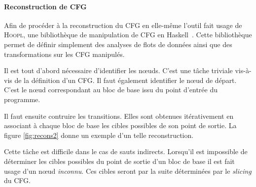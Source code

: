       \paragraph{Reconstruction de CFG}
      { %

        Afin de procéder à la reconstruction du CFG en elle-même l'outil fait
        usage de \textsc{Hoopl}, une bibliothèque de manipulation de CFG en
        Haskell~\cite{RDP10}. Cette bibliothèque permet de définir simplement
        des analyses de flots de données ainsi que des transformations sur les
        CFG manipulés.

        \medskip
        
        Il est tout d'abord nécessaire d'identifier les n{\oe}uds. C'est une
        tâche triviale vis-à-vis de la définition d'un CFG. Il faut également
        identifier le n{\oe}ud de départ. C'est le n{\oe}ud correspondant au
        bloc de base issu du point d'entrée du programme.

        Il faut ensuite contruire les transitions. Elles sont obtenues
        itérativement en associant à chaque bloc de base les cibles possibles de
        son point de sortie. La figure \ref{fig:recons2} donne un exemple d'un
        telle reconstruction.

        Cette tâche est difficile dans le cas de sauts indirects. Lorsqu'il est
        impossible de déterminer les cibles possibles du point de sortie d'un
        bloc de base il est fait usage d'un n{\oe}ud \textit{inconnu}. Ces
        cibles seront par la suite déterminées par le \textit{slicing} du CFG. }
        

